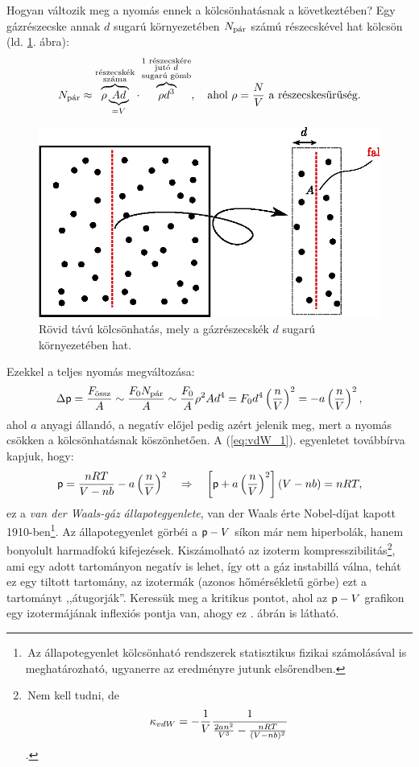 Hogyan változik meg a nyomás ennek a kölcsönhatásnak a következtében? Egy gázrészecske annak $d$ sugarú környezetében $N_{\textnormal{pár}}$ számú részecskével hat kölcsön (ld. \ref{fig:termo_4_6}. ábra):
\begin{align}
    N_{\textnormal{pár}} \approx \overbrace{\rho\underbrace{Ad}_{=V}}^{\substack{\textnormal{részecskék}\\\textnormal{száma}}}\cdot\overbrace{\rho d^3}^{\substack{\textnormal{1 részecskére}\\\textnormal{jutó $d$}\\\textnormal{sugarú gömb}}},\quad \textnormal{ahol }\rho=\frac NV\textnormal{ a részecskesűrűség}.
\end{align}
\begin{figure}[htb]
    \centering
    \includegraphics{termo_4/termo_4_6.eps}
    \caption{Rövid távú kölcsönhatás, mely a gázrészecskék $d$ sugarú környezetében hat.}
    \label{fig:termo_4_6}
\end{figure}
Ezekkel a teljes nyomás megváltozása:
\begin{align}
    \Delta\mathsf p = \frac{F_{\textnormal{össz}}}{A}\sim \frac{F_0N_{\textnormal{pár}}}{A}\sim \frac{F_0}{A}\rho^2 A d^4 = F_0d^4\left({\frac nV}\right)^2 = -a\left({\frac nV}\right)^2,
\end{align}
ahol $a$ anyagi állandó, a negatív előjel pedig azért jelenik meg, mert a nyomás csökken a kölcsönhatásnak köszönhetően. A (\ref{eq:vdW_1}). egyenletet továbbírva kapjuk, hogy:
\begin{align}
    \mathsf p = \frac{nRT}{V-nb}-a\left({\frac nV}\right)^2 \quad\Rightarrow\quad \left[{\mathsf p+a\left({\frac nV}\right)^2}\right](V-nb) = nRT,
\end{align}
ez a \emph{van der Waals-gáz állapotegyenlete}, van der Waals érte Nobel-díjat kapott 1910-ben\footnote{\,Az állapotegyenlet kölcsönható rendszerek statisztikus fizikai számolásával is meghatározható, ugyanerre az eredményre jutunk elsőrendben.}. Az állapotegyenlet görbéi a $\mathsf p-V$ síkon már nem hiperbolák, hanem bonyolult harmadfokú kifejezések. Kiszámolható az izoterm kompresszibilitás\footnote{\,Nem kell tudni, de $$\kappa_{vdW} = -\frac{1}{V} \frac{1}{\frac{2an^2}{V^3}-\frac{nRT}{(V-nb)^2}}$$.}, ami egy adott tartományon negatív is lehet, így ott a gáz instabillá válna, tehát ez egy tiltott tartomány, az izotermák (azonos hőmérsékletű görbe) ezt a tartományt ,,átugorják''. Keressük meg a kritikus pontot, ahol az $\mathsf p-V$ grafikon egy izotermájának inflexiós pontja van, ahogy ez . ábrán is látható.
